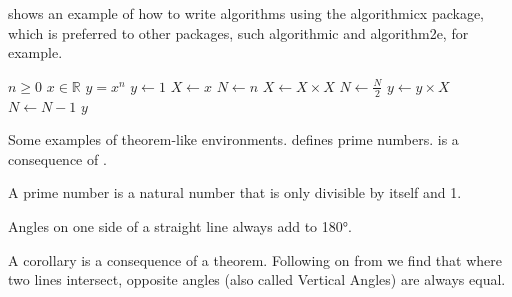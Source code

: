  shows an example of how to write algorithms using the algorithmicx package, which is preferred to other packages, such algorithmic and algorithm2e, for example.

\begin{algorithm}[hbt] %
  \caption{Computing the power of a real number}
  \label{alg:power}
  \begin{algorithmic}[1] %
    \Require
    \Statex $n \geq 0$ 
    \Statex $x \in \mathbb{R}$
    \Ensure
    \Statex $y = x^n$
    \Statex %
    \State $y \gets 1$
    \State $X \gets x$
    \State $N \gets n$
      
    \State $X \gets X \times X$
    \State $N \gets \frac{N}{2} $  
    \State $y \gets y \times X$
    \State $N \gets N - 1$
    \EndIf
    \EndWhile
    \State \Return $y$
  \end{algorithmic}
\end{algorithm}



Some examples of theorem-like environments.  defines prime numbers.  is a consequence of .
%
\begin{definition}\label{def:prime}
  A prime number is a natural number that is only divisible by itself and 1.
\end{definition}
%
\begin{theorem}\label{thm:one-side-line}
  Angles on one side of a straight line always add to \ang{180}.
\end{theorem}
%
\begin{corollary}\label{cor:vertical-angles}
  A corollary is a consequence of a theorem. 
  Following on from  we find that where two lines intersect, opposite angles (also called Vertical Angles) are always equal.
\end{corollary}